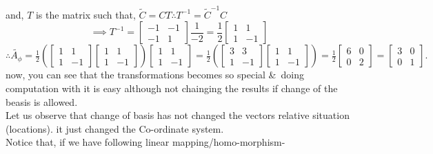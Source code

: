 \documentclass[12pt]{article}
\begin{document}
and, $T$ is the matrix such that, $\tilde{C}=CT
\therefore T^{-1}=\tilde{C}^{-1}C$
\begin{equation*}
    \implies T^{-1}=
    \begin{bmatrix}
        -1 & -1\\
        -1 & 1
    \end{bmatrix}\frac{1}{-2}
    =\frac{1}{2}\begin{bmatrix}
        1 & 1\\
        1 & -1
    \end{bmatrix}
\end{equation*}
$\therefore\tilde{A_{\phi}}=
\frac{1}{2}\left(
\begin{bmatrix}
    1 & 1\\
    1 & -1
\end{bmatrix}
\begin{bmatrix}
        1 & 1\\
        1 & -1
\end{bmatrix}
\right)
\begin{bmatrix}
    1 & 1\\
    1 & -1
\end{bmatrix}
= \frac{1}{2}\left(
\begin{bmatrix}
    3 & 3\\
    1 & -1
\end{bmatrix}
\begin{bmatrix}
        1 & 1\\
        1 & -1
\end{bmatrix}
\right)=
\frac{1}{2}\begin{bmatrix}
    6 & 0\\
    0 & 2
\end{bmatrix}=
\begin{bmatrix}
    3 & 0\\
    0 & 1
\end{bmatrix}.
$
\\
\newline
now, you can see that the transformations becomes so special \&\ doing computation with it is easy although not chainging the results if change of the beasis is allowed.
\newline
\\Let us observe that change of basis has not changed the vectors relative situation (locations). it just changed the Co-ordinate system.
\newline\\Notice that, if we have following linear mapping/homo-morphism-
\end{document}
